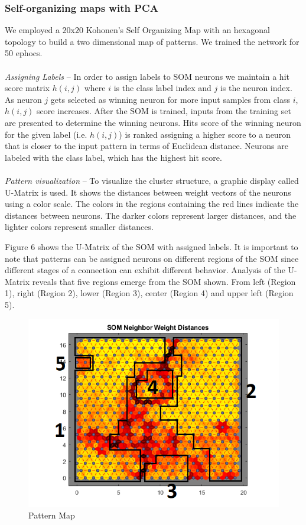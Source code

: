 \documentclass[twocolumn,11pt]{asme2ej}
\begin{document}
\subsubsection{Self-organizing maps with PCA}

We employed a $20$x$20$ Kohonen's Self Organizing Map with an hexagonal topology to build a two dimensional map of patterns. We trained the network for 50 ephocs.
\\\\
\textit{Assigning Labels} -- In order to assign labels to SOM neurons we maintain a hit score matrix $h(i,j)$ where $i$ is the class label index and $j$ is the neuron index. As neuron $j$ gets selected as winning neuron for more input samples from class $i$, $h(i,j)$ score increases. After the SOM is trained, inputs from the training set are presented to determine the winning neurons. Hits score of the winning neuron for the given label (i.e. $h(i,j)$) is ranked assigning a higher score to a neuron that is closer to the input pattern in terms of Euclidean distance. Neurons are labeled with the class label, which has the highest hit score.
\\\\
\textit{Pattern visualization} -- To visualize the cluster structure, a graphic display called U-Matrix is used. It shows the distances between weight vectors of the neurons using a color scale. The colors in the regions containing the red lines indicate the distances between neurons. The darker colors represent larger distances, and the lighter colors represent smaller distances. 

Figure 6 shows the U-Matrix of the SOM with assigned labels. It is important to note that patterns can be assigned neurons on different regions of the SOM since different stages of a connection can exhibit different behavior. Analysis of the U-Matrix reveals that five regions emerge from the SOM shown. From left (Region 1), right (Region 2), lower (Region 3), center (Region 4) and upper left (Region 5).

\begin{figure}[h]
\centering
\includegraphics[scale=0.63]{U-Matrix2.png}
\caption{Pattern Map}
\end{figure}
\end{document}
